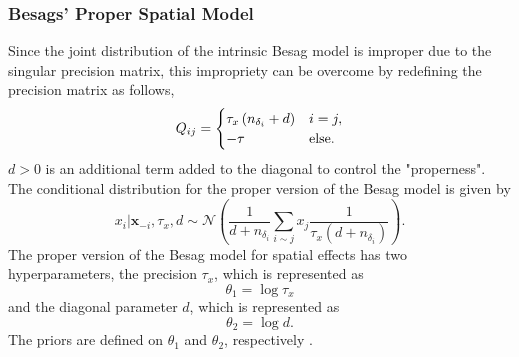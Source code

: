 \subsubsection{Besags' Proper Spatial Model}
Since the joint distribution of the intrinsic Besag model is improper due to the singular precision matrix, this impropriety can be overcome by redefining the precision matrix as follows,
\begin{equation}
    Q_{ij} = \begin{cases}
    \tau_x\left(n_{\delta_i}+d\right) & i=j,\\
    -\tau &\hbox{else.}
    \end{cases}
\end{equation}
$d > 0$  is an additional term added to the diagonal to control the "properness". The conditional distribution for the proper version of the Besag model is given by
\begin{equation}
    x_i|\pmb{x}_{-i},\tau_x,d\sim\mathcal{N}\left(\frac{1}{d+n_{\delta_i}}\sum_{i\sim j}x_j\frac{1}{\tau_x\left(d+n_{\delta_i}\right)}\right).
\end{equation}
The proper version of the Besag model for spatial effects has two hyperparameters, the precision $\tau_x$, which is represented as
\begin{equation}
    \theta_1 = \log\tau_x
\end{equation}
and the diagonal parameter $d$, which is represented as
\begin{equation}
    \theta_2 = \log d.
\end{equation}
The priors are defined on $\theta_1$ and $\theta_2$, respectively \autocite[][]{besag1974spatial, riebler2016intuitive}.
